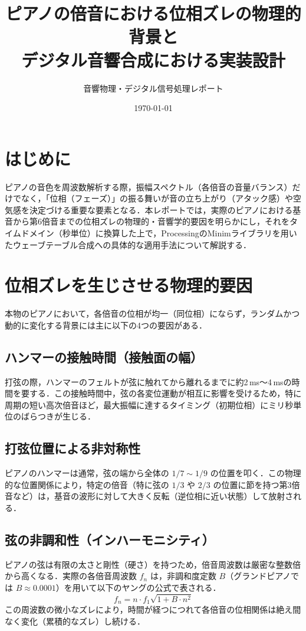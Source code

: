 \documentclass[uplatex,dvipdfmx]{jlreq}
\begin{document}
\title{ピアノの倍音における位相ズレの物理的背景と\\デジタル音響合成における実装設計}
\author{音響物理・デジタル信号処理レポート}
\date{\today}

\maketitle

\section{はじめに}
ピアノの音色を周波数解析する際，振幅スペクトル（各倍音の音量バランス）だけでなく，「位相（フェーズ）」の振る舞いが音の立ち上がり（アタック感）や空気感を決定づける重要な要素となる．本レポートでは，実際のピアノにおける基音から第6倍音までの位相ズレの物理的・音響学的要因を明らかにし，それをタイムドメイン（秒単位）に換算した上で，ProcessingのMinimライブラリを用いたウェーブテーブル合成への具体的な適用手法について解説する．

\section{位相ズレを生じさせる物理的要因}
本物のピアノにおいて，各倍音の位相が均一（同位相）にならず，ランダムかつ動的に変化する背景には主に以下の4つの要因がある．

\subsection{ハンマーの接触時間（接触面の幅）}
打弦の際，ハンマーのフェルトが弦に触れてから離れるまでに約2\,ms〜4\,msの時間を要する．この接触時間中，弦の各変位運動が相互に影響を受けるため，特に周期の短い高次倍音ほど，最大振幅に達するタイミング（初期位相）にミリ秒単位のばらつきが生じる．

\subsection{打弦位置による非対称性}
ピアノのハンマーは通常，弦の端から全体の $1/7 \sim 1/9$ の位置を叩く．この物理的な位置関係により，特定の倍音（特に弦の $1/3$ や $2/3$ の位置に節を持つ第3倍音など）は，基音の波形に対して大きく反転（逆位相に近い状態）して放射される．

\subsection{弦の非調和性（インハーモニシティ）}
ピアノの弦は有限の太さと剛性（硬さ）を持つため，倍音周波数は厳密な整数倍から高くなる．実際の各倍音周波数 $f_n$ は，非調和度定数 $B$（グランドピアノでは $B \approx 0.0001$）を用いて以下のヤングの公式で表される．
\begin{equation}
f_n = n \cdot f_1 \sqrt{1 + B \cdot n^2}
\end{equation}
この周波数の微小なズレにより，時間が経つにつれて各倍音の位相関係は絶え間なく変化（累積的なズレ）し続ける．
\end{document}

